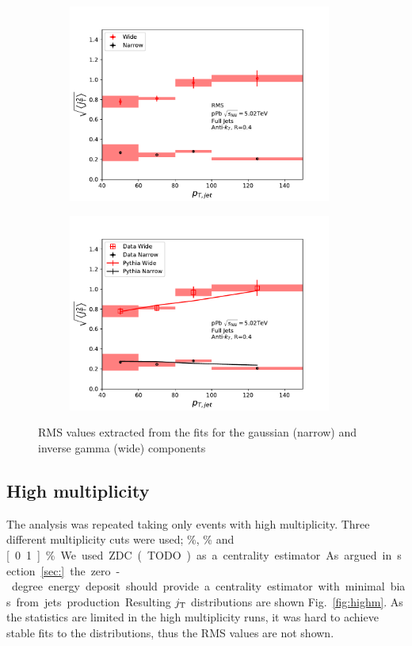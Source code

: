 \begin{figure}[htb]
\begin{subfigure}{0.5\textwidth}
\includegraphics[width=0.95\textwidth]{results/RMSWithSystematics}
\end{subfigure}
\begin{subfigure}{0.5\textwidth}
\includegraphics[width=0.95\textwidth]{results/RMSWithSystematics_Pythia}
\end{subfigure}
\caption{RMS values extracted from the fits for the gaussian (narrow) and inverse gamma (wide) components}
\label{fig:rms}
\end{figure}

\subsection{High multiplicity}
The analysis was repeated taking only events with high multiplicity. Three different multiplicity cuts were used; \unit[10]{\%}, \unit[1]{\%} and \unit[0.1]{\%}. We used ZDC(TODO) as a centrality estimator. As argued in section ~\ref{sec:} the zero-degree energy deposit should provide a centrality estimator with minimal bias from jets production. Resulting $j_{\rm T}$ distributions are shown Fig.~\ref{fig:highm}. As the statistics are limited in the high multiplicity runs, it was hard to achieve stable fits to the distributions, thus the RMS values are not shown.

